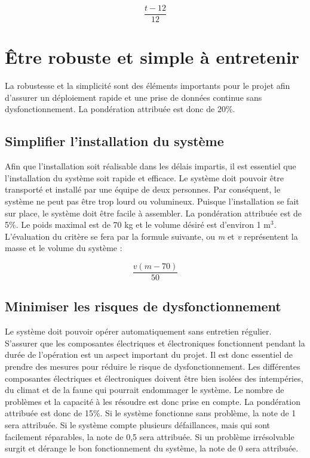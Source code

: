 \begin{equation}
  \frac{t - 12}{12}
\end{equation}

\section{Être robuste et simple à entretenir}

La robustesse et la simplicité sont des éléments importants pour le projet afin
d’assurer un déploiement rapide et une prise de données continue sans
dysfonctionnement. La pondération attribuée est donc de 20\%.

\subsection{Simplifier l'installation du système}

Afin que l’installation soit réalisable dans les délais impartis, il est
essentiel que l’installation du système soit rapide et efficace. Le système
doit pouvoir être transporté et installé par une équipe de deux personnes. Par
conséquent, le système ne peut pas être trop lourd ou volumineux. Puisque
l’installation se fait sur place, le système doit être facile à assembler. La
pondération attribuée est de 5\%. Le poids maximal est de 70 kg et le volume
désiré est d’environ 1 $\text{m}^3$. L’évaluation du critère se fera par la
formule suivante, ou \textit{m} et \textit{v} représentent la masse et le
volume du système :

\begin{equation}
  \frac{v(m - 70)}{50}
\end{equation}

\subsection{Minimiser les risques de dysfonctionnement} %

Le système doit pouvoir opérer automatiquement sans entretien régulier.
S’assurer que les composantes électriques et électroniques fonctionnent pendant
la durée de l’opération est un aspect important du projet. Il est donc
essentiel de prendre des mesures pour réduire le risque de dysfonctionnement.
Les différentes composantes électriques et électroniques doivent être bien
isolées des intempéries, du climat et de la faune qui pourrait endommager le
système. Le nombre de problèmes et la capacité à les résoudre est donc prise en
compte. La pondération attribuée est donc de 15\%. Si le système fonctionne
sans problème, la note de 1 sera attribuée. Si le système compte plusieurs
défaillances, mais qui sont facilement réparables, la note de 0,5 sera
attribuée. Si un problème irrésolvable surgit et dérange le bon fonctionnement
du système, la note de 0 sera attribuée.

